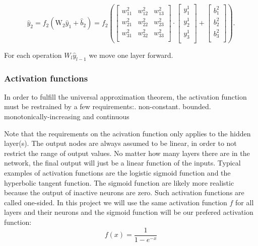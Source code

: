 \documentclass[a4paper,12pt]{article}
\begin{document}
\begin{equation}
 \hat{y}_2 = f_2(\mathrm{W}_2 \hat{y}_{1} + \hat{b}_{2}) = 
 f_2\left(\left[\begin{array}{ccc}
    w^2_{11} &w^2_{12} &w^2_{13} \\
    w^2_{21} &w^2_{22} &w^2_{23} \\
    w^2_{31} &w^2_{32} &w^2_{33} \\
    \end{array} \right] \cdot
    \left[\begin{array}{c}
           y^1_1 \\
           y^1_2 \\
           y^1_3 \\
          \end{array}\right] + 
    \left[\begin{array}{c}
           b^2_1 \\
           b^2_2 \\
           b^2_3 \\
          \end{array}\right]\right).
\end{equation}

For each operation $W_l \hat{y}_{l-1}$ we move one layer forward.\newline

\subsubsection{Activation functions}
In order to fulfill the universal approximation theorem, the activation function must be restrained by a few requirements:. non-constant. bounded. monotonically-increasing and continuous\newline

Note that the requirements on the acivation function only applies to the hidden layer(s). The output nodes are always assumed to be linear, in order to not restrict the range of output values. No matter how many layers there are in the network, the final output will just be a linear function of the inputs.\newline
Typical examples of activation functions are the logistic sigmoid function and the hyperbolic tangent function. The sigmoid function are likely more realistic because the output of inactive neurons are zero. Such activation functions are called one-sided. In this project we will use the same activation function $f$ for all layers and their neurons and the sigmoid function will be our prefered activation function: 
\begin{equation}
    f(x) = \frac{1}{ 1 - e^{-x} }
\end{equation}
\end{document}

